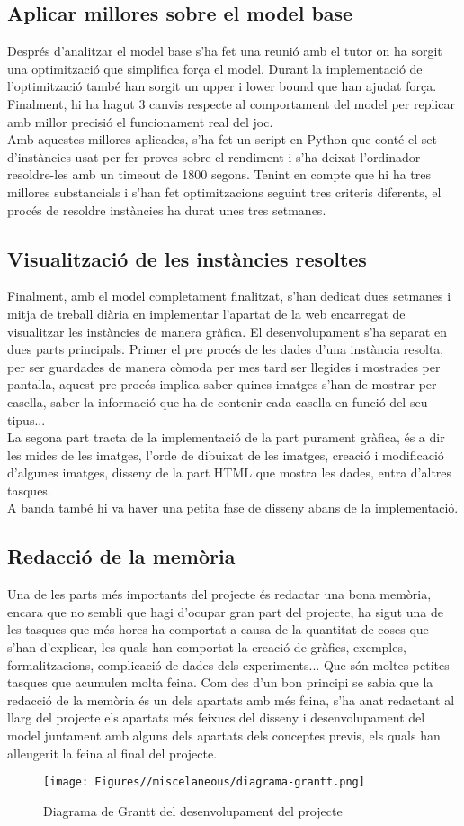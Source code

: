 \subsection{Aplicar millores sobre el model base}
Després d'analitzar el model base s'ha fet una reunió amb el tutor on ha sorgit una optimització que simplifica força el model. Durant la implementació de l'optimització també han sorgit un upper i lower bound que han ajudat força. Finalment, hi ha hagut 3 canvis respecte al comportament del model per replicar amb millor precisió el funcionament real del joc.\\
Amb aquestes millores aplicades, s'ha fet un script en Python que conté el set d'instàncies usat per fer proves sobre el rendiment i s'ha deixat l'ordinador resoldre-les amb un timeout de 1800 segons. Tenint en compte que hi ha tres millores substancials i s'han fet optimitzacions seguint tres criteris diferents, el procés de resoldre instàncies ha durat unes tres setmanes.

\subsection{Visualització de les instàncies resoltes}
Finalment, amb el model completament finalitzat, s'han dedicat dues setmanes i mitja de treball diària en implementar l'apartat de la web encarregat de visualitzar les instàncies de manera gràfica. El desenvolupament s'ha separat en dues parts principals. Primer el pre procés de les dades d'una instància resolta, per ser guardades de manera còmoda per mes tard ser llegides i mostrades per pantalla, aquest pre procés implica saber quines imatges s'han de mostrar per casella, saber la informació que ha de contenir cada casella en funció del seu tipus...\\
La segona part tracta de la implementació de la part purament gràfica, és a dir les mides de les imatges, l'orde de dibuixat de les imatges, creació i modificació d'algunes imatges, disseny de la part HTML que mostra les dades, entra d'altres tasques.\\
A banda també hi va haver una petita fase de disseny abans de la implementació.

\subsection{Redacció de la memòria}
Una de les parts més importants del projecte és redactar una bona memòria, encara que no sembli que hagi d'ocupar gran part del projecte, ha sigut una de les tasques que més hores ha comportat a causa de la quantitat de coses que s'han d'explicar, les quals han comportat la creació de gràfics, exemples, formalitzacions, complicació de dades dels experiments... Que són moltes petites tasques que acumulen molta feina. Com des d'un bon principi se sabia que la redacció de la memòria és un dels apartats amb més feina, s'ha anat redactant al llarg del projecte els apartats més feixucs del disseny i desenvolupament del model juntament amb alguns dels apartats dels conceptes previs, els quals han alleugerit la feina al final del projecte.

\begin{sidewaysfigure}
    \centering
    \texttt{[image: Figures//miscelaneous/diagrama-grantt.png]}
    \caption{Diagrama de Grantt del desenvolupament del projecte}
    \label{fig:diagrama-grantt}
\end{sidewaysfigure}

